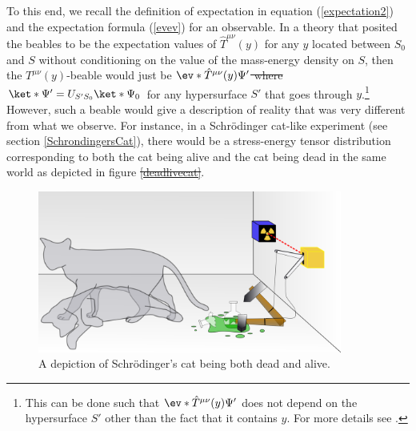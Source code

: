 \documentclass[12pt]{report}
\providecommand{\DIFadd}[1]{{\protect\color{blue}\uwave{#1}}} %
\providecommand{\DIFdel}[1]{{\protect\color{red}\sout{#1}}}                      %
\providecommand{\DIFaddbegin}{} %
\providecommand{\DIFaddend}{} %
\providecommand{\DIFdelbegin}{} %
\providecommand{\DIFdelend}{} %
\providecommand{\DIFaddbeginFL}{} %
\providecommand{\DIFaddendFL}{} %
\providecommand{\DIFdelbeginFL}{} %
\providecommand{\DIFdelendFL}{} %
\begin{document}
To this end, we recall the definition of expectation in equation (\ref{expectation2}) and the expectation formula (\ref{evev}) for an observable. In a theory that posited the beables to be the expectation values of $\hat{T}^{\mu\nu}(y)$ for any $y$ located between $S_0$ and $S$  without conditioning on the value of the mass-energy density \DIFaddbegin \DIFadd{$T_S$ }\DIFaddend on $S$, then the $T^{\mu\nu}(y)$-beable would just be \DIFdelbegin \DIFdel{$\ev*{\hat{T}^{\mu\nu}(y)}{\Psi'}$ where $\ket*{\Psi'}=U_{S'S_0}\ket*{\Psi_0}$ }\DIFdelend \DIFaddbegin \DIFadd{$\ev*{\hat{T}^{\mu\nu}(y)}{\Psi_{S'}}$ where $\ket*{\Psi_{S'}}=U_{S'S_0}\ket*{\Psi_0}$ }\DIFaddend for any hypersurface $S'$ that goes through $y$.\footnote{This can be done such that \DIFdelbegin \DIFdel{$\ev*{\hat{T}^{\mu\nu}(y)}{\Psi'}$ }\DIFdelend \DIFaddbegin \DIFadd{$\ev*{\hat{T}^{\mu\nu}(y)}{\Psi_{S'}}$ }\DIFaddend does not depend on the hypersurface $S'$ other than the fact that it contains $y$. For more details see \cite{SchwingerJulianI}.} However, such a beable would give a description of reality that was very different from what we observe. For instance, in a Schr\"{o}dinger cat-like experiment (see section \ref{SchrondingersCat}), there would be a stress-energy tensor distribution corresponding to both the cat being alive and the cat being dead in the same world as depicted in figure \DIFdelbegin \DIFdel{\ref{deadlivecat}}\DIFdelend \DIFaddbegin \DIFadd{\ref{deadlivecat2}}\DIFaddend .
\begin{figure}[ht!]
  \captionsetup{justification=justified}
  \centering
  \includegraphics[width=100mm]{Chapter03/Schrodingers_cat.png}
  \DIFdelbeginFL %
\DIFdelendFL \DIFaddbeginFL \caption[Depiction of Schr\"{o}dinger's cat]{\DIFaddendFL A depiction of Schr\"{o}dinger's cat being both dead and alive.\protect\footnotemark}
  \DIFdelbeginFL %
\DIFdelendFL \DIFaddbeginFL \label{deadlivecat2}
  \DIFaddendFL \end{figure}
\end{document}
